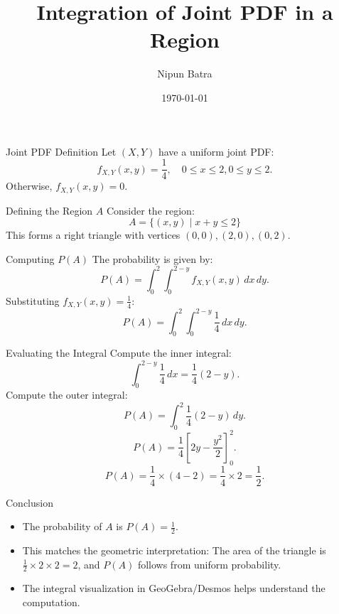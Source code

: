 \documentclass{beamer}
\title{Integration of Joint PDF in a Region}
\author{Nipun Batra}
\date{\today}
\begin{document}
\frame{\titlepage}

\begin{frame}{Joint PDF Definition}
    Let \( (X, Y) \) have a uniform joint PDF:
    \[
        f_{X,Y}(x, y) = \frac{1}{4}, \quad 0 \leq x \leq 2, 0 \leq y \leq 2.
    \]
    Otherwise, \( f_{X,Y}(x, y) = 0 \).
\end{frame}

\begin{frame}{Defining the Region \( A \)}
    Consider the region:
    \[
        A = \{(x, y) \mid x + y \leq 2\}
    \]
    This forms a right triangle with vertices \( (0,0), (2,0), (0,2) \).
\end{frame}

\begin{frame}{Computing \( P(A) \)}
    The probability is given by:
    \[
        P(A) = \int_0^2 \int_0^{2-y} f_{X,Y}(x, y) \, dx \, dy.
    \]
    Substituting \( f_{X,Y}(x, y) = \frac{1}{4} \):
    \[
        P(A) = \int_0^2 \int_0^{2-y} \frac{1}{4} \, dx \, dy.
    \]
\end{frame}

\begin{frame}{Evaluating the Integral}
    Compute the inner integral:
    \[
        \int_0^{2-y} \frac{1}{4} \, dx = \frac{1}{4} (2-y).
    \]
    Compute the outer integral:
    \[
        P(A) = \int_0^2 \frac{1}{4} (2-y) \, dy.
    \]
    \[
        P(A) = \frac{1}{4} \left[ 2y - \frac{y^2}{2} \right]_0^2.
    \]
    \[
        P(A) = \frac{1}{4} \times \left( 4 - 2 \right) = \frac{1}{4} \times 2 = \frac{1}{2}.
    \]
\end{frame}

\begin{frame}{Conclusion}
    \begin{itemize}
        \item The probability of \( A \) is \( P(A) = \frac{1}{2} \).
        \item This matches the geometric interpretation: The area of the triangle is \( \frac{1}{2} \times 2 \times 2 = 2 \), and \( P(A) \) follows from uniform probability.
        \item The integral visualization in GeoGebra/Desmos helps understand the computation.
    \end{itemize}
\end{frame}
\end{document}

